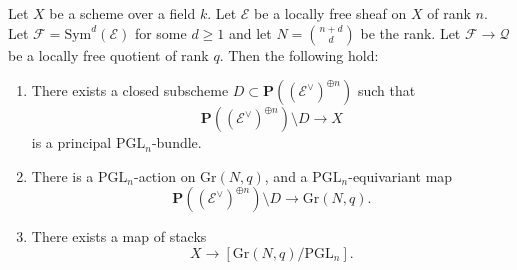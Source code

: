\begin{lemma}
\label{lemma-grassman-quotient-stack-map}
Let $X$ be a scheme over a field $k$.
Let $\mathcal{E}$ be a locally free sheaf on $X$ of rank $n$.
Let $\mathcal{F} = \mathrm{Sym}^d(\mathcal{E})$ for some $d \geq 1$ and
let $N = \binom{n + d}{d}$ be the rank.
Let $\mathcal{F} \to \mathcal{Q}$ be a locally free quotient of rank $q$.
Then the following hold:
\begin{enumerate}
\item There exists a closed subscheme
  $D \subset \mathbf{P}((\mathcal{E}^\vee)^{\oplus n})$ such that
$$
\mathbf{P}((\mathcal{E}^\vee)^{\oplus n}) \setminus D \longrightarrow X
$$
is a principal $\mathrm{PGL}_n$-bundle.
\item There is a $\mathrm{PGL}_n$-action on $\mathrm{Gr}(N,q)$, and
a $\mathrm{PGL}_n$-equivariant map
$$
\mathbf{P}((\mathcal{E}^\vee)^{\oplus n}) \setminus D \longrightarrow
\mathrm{Gr}(N,q).
$$
\item There exists a map of stacks
$$
X \longrightarrow [\mathrm{Gr}(N,q)/\mathrm{PGL}_n].
$$
\end{enumerate}
\end{lemma}
